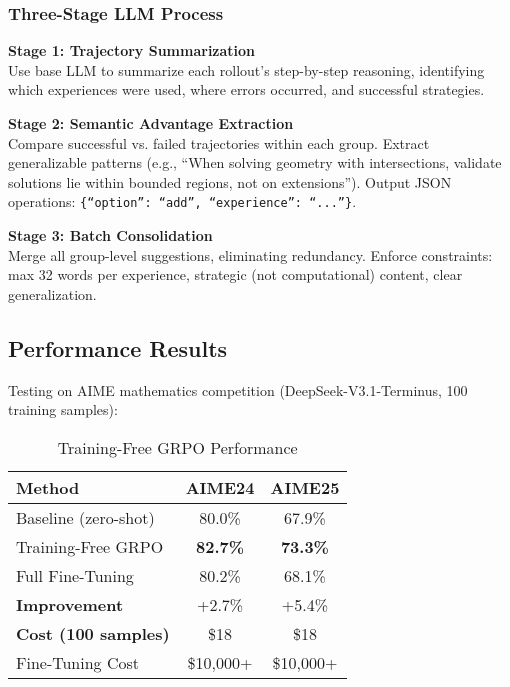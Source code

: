 \documentclass[twocolumn,11pt]{article}
\begin{document}
\subsubsection{Three-Stage LLM Process}

\textbf{Stage 1: Trajectory Summarization} \\
Use base LLM to summarize each rollout's step-by-step reasoning, identifying which experiences were used, where errors occurred, and successful strategies.

\textbf{Stage 2: Semantic Advantage Extraction} \\
Compare successful vs. failed trajectories within each group. Extract generalizable patterns (e.g., ``When solving geometry with intersections, validate solutions lie within bounded regions, not on extensions''). Output JSON operations: \texttt{\{``option'': ``add'', ``experience'': ``...''\}}.

\textbf{Stage 3: Batch Consolidation} \\
Merge all group-level suggestions, eliminating redundancy. Enforce constraints: max 32 words per experience, strategic (not computational) content, clear generalization.

\subsection{Performance Results}

Testing on AIME mathematics competition (DeepSeek-V3.1-Terminus, 100 training samples):

\begin{table}[h]
\centering
\caption{Training-Free GRPO Performance}
\label{tab:grpo-performance}
\begin{tabular}{@{}lcc@{}}
\toprule
\textbf{Method} & \textbf{AIME24} & \textbf{AIME25} \\ \midrule
Baseline (zero-shot) & 80.0\% & 67.9\% \\
Training-Free GRPO & \textbf{82.7\%} & \textbf{73.3\%} \\
Full Fine-Tuning & 80.2\% & 68.1\% \\ \midrule
\textbf{Improvement} & +2.7\% & +5.4\% \\ \midrule
\textbf{Cost (100 samples)} & \$18 & \$18 \\
Fine-Tuning Cost & \$10,000+ & \$10,000+ \\
\bottomrule
\end{tabular}
\end{table}
\end{document}
